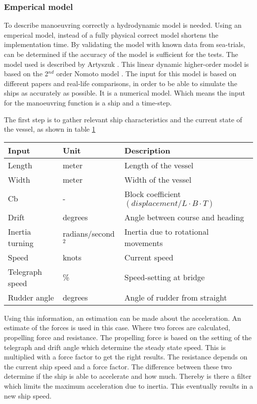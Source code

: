 \subsubsection{Emperical model}
To describe manoeuvring correctly a hydrodynamic model is needed. Using an emperical model, instead of a fully physical correct model shortens the implementation time. By validating the model with known data from sea-trials, can be determined if the accuracy of the model is sufficient for the tests. The model used is described by Artyszuk \cite{Artyszuk2016}. This linear dynamic higher-order model is based on the 2$^{nd}$ order Nomoto model \cite{Nomoto1957}. The input for this model is based on different papers and real-life comparisons, in order to be able to simulate the ships as accurately as possible. It is a numerical model. Which means the input for the manoeuvring function is a ship and a time-step.

The first step is to gather relevant ship characteristics and the current state of the vessel, as shown in table \ref{tab:input-hydro-model}
\begin{table}[p]
	\centering
	\begin{tabular}{p{}|p{}|p{}}
		\toprule
		Input & Unit & Description\\
		\midrule
		Length & meter & Length of the vessel\\
		Width & meter & Width of the vessel \\
		Cb & - & Block coefficient $(displacement / L \cdot B \cdot T)$ \\
		Drift & degrees & Angle between course and heading \\
		Inertia turning & radians/second$^2$ & Inertia due to rotational movements \\
		Speed & knots & Current speed \\
		Telegraph speed & \% & Speed-setting at bridge\\
		Rudder angle & degrees & Angle of rudder from straight \\
		\bottomrule
	\end{tabular}
	
	\label{tab:input-hydro-model}
\end{table}

Using this information, an estimation can be made about the acceleration. An estimate of the forces is used in this case. Where two forces are calculated, propelling force and resistance. The propelling force is based on the setting of the telegraph and drift angle which determine the steady state speed. This is multiplied with a force factor to get the right results. The resistance depends on the current ship speed and a force factor. The difference between these two determine if the ship is able to accelerate and how much. Thereby is there a filter which limits the maximum acceleration due to inertia. This eventually results in a new ship speed.

